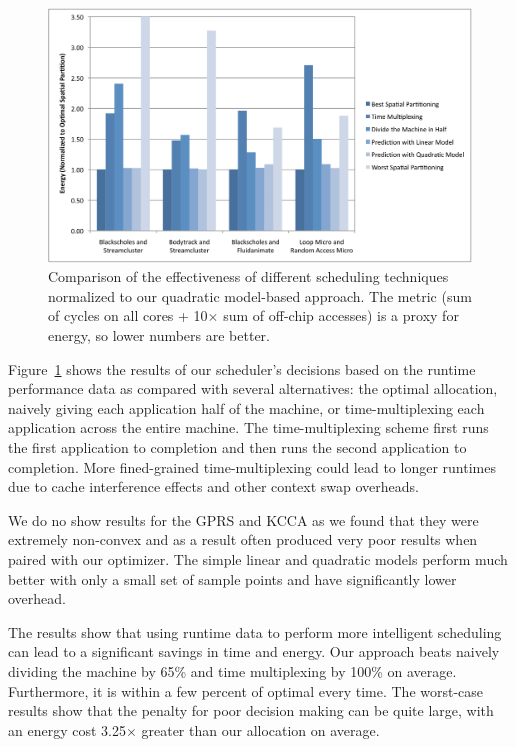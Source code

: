 \begin{figure}[tb]
  \begin{center}
    \includegraphics[width=\linewidth]{Figures/scheduling_results_energy.pdf}
  \end{center}
  \caption{Comparison of the effectiveness of different scheduling
    techniques normalized to our quadratic model-based approach.  The
    metric (sum of cycles on all cores + 10$\times$ sum of off-chip
    accesses) is a proxy for energy, so lower numbers are better.}
  \label{fig:scheduling_results}
\end{figure}




Figure~\ref{fig:scheduling_results} shows the results of our
scheduler's decisions based on the runtime performance data as
compared with several alternatives: the optimal allocation, naively
giving each application half of the machine, or time-multiplexing each
application across the entire machine.  The time-multiplexing scheme
first runs the first application to completion and then runs the
second application to completion.  More fined-grained
time-multiplexing could lead to longer runtimes due to cache
interference effects and other context swap overheads.

We do no show results for the GPRS and KCCA as we found that they were extremely non-convex and as a result often produced very poor results when paired with our optimizer. The simple linear and quadratic models perform much better with only a small set of sample points and have significantly lower overhead.

The results
show that using runtime data to perform more intelligent scheduling
can lead to a significant savings in time and energy.  Our approach
beats naively dividing the machine by 65\% and time multiplexing by
100\% on average. Furthermore, it is within a few percent of optimal
every time.  The worst-case results show that the penalty for poor
decision making can be quite large, with an energy cost 3.25$\times$
greater than our allocation on average.

